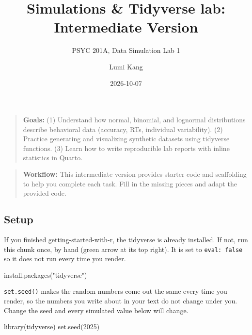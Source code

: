 \documentclass[
  letterpaper,
  DIV=11,
  numbers=noendperiod]{scrartcl}
\title{Simulations \& Tidyverse lab: Intermediate Version}
\subtitle{PSYC 201A, Data Simulation Lab 1}
\author{Lumi Kang}
\date{2026-10-07}
\newenvironment{Shaded}{\begin{snugshade}}{\end{snugshade}}
\newcommand{\DecValTok}[1]{\textcolor[rgb]{0.68,0.00,0.00}{#1}}
\newcommand{\FunctionTok}[1]{\textcolor[rgb]{0.28,0.35,0.67}{#1}}
\newcommand{\NormalTok}[1]{\textcolor[rgb]{0.00,0.23,0.31}{#1}}
\newcommand{\StringTok}[1]{\textcolor[rgb]{0.13,0.47,0.30}{#1}}
\renewcommand*\contentsname{Table of contents}
\newcommand\contentsname{Table of contents}
\begin{document}
\maketitle

\renewcommand*\contentsname{Table of contents}
{
\setcounter{tocdepth}{2}
\tableofcontents
}

\begin{quote}
\textbf{Goals:} (1) Understand how normal, binomial, and lognormal
distributions describe behavioral data (accuracy, RTs, individual
variability). (2) Practice generating and visualizing synthetic datasets
using tidyverse functions. (3) Learn how to write reproducible lab
reports with inline statistics in Quarto.
\end{quote}

\begin{quote}
\textbf{Workflow:} This intermediate version provides starter code and
scaffolding to help you complete each task. Fill in the missing pieces
and adapt the provided code.
\end{quote}

\subsection{Setup}\label{setup}

If you finished getting-started-with-r, the tidyverse is already
installed. If not, run this chunk once, by hand (green arrow at its top
right). It is set to \texttt{eval:\ false} so it does not run every time
you render.

\begin{Shaded}
\begin{Highlighting}[]
\FunctionTok{install.packages}\NormalTok{(}\StringTok{"tidyverse"}\NormalTok{)}
\end{Highlighting}
\end{Shaded}

\texttt{set.seed()} makes the random numbers come out the same every
time you render, so the numbers you write about in your text do not
change under you. Change the seed and every simulated value below will
change.

\begin{Shaded}
\begin{Highlighting}[]
\FunctionTok{library}\NormalTok{(tidyverse)}
\FunctionTok{set.seed}\NormalTok{(}\DecValTok{2025}\NormalTok{)}
\end{Highlighting}
\end{Shaded}
\end{document}
